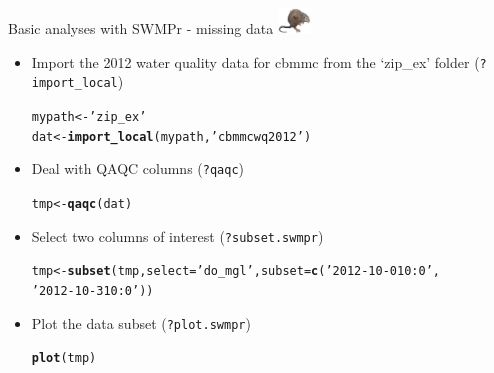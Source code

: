 \documentclass[xcolor=dvipsnames,serif]{beamer}\usepackage[]{graphicx}\usepackage[]{color}
\makeatletter
\newcommand{\hlstr}[1]{\textcolor[rgb]{0.192,0.494,0.8}{#1}}%
\newcommand{\hlstd}[1]{\textcolor[rgb]{0.345,0.345,0.345}{#1}}%
\newcommand{\hlkwb}[1]{\textcolor[rgb]{0.69,0.353,0.396}{#1}}%
\newcommand{\hlkwc}[1]{\textcolor[rgb]{0.333,0.667,0.333}{#1}}%
\newcommand{\hlkwd}[1]{\textcolor[rgb]{0.737,0.353,0.396}{\textbf{#1}}}%
\newenvironment{kframe}{%
 \def\at@end@of@kframe{}%
 \ifinner\ifhmode%
  \def\at@end@of@kframe{\end{minipage}}%
  \begin{minipage}{\columnwidth}%
 \fi\fi%
 \def\FrameCommand##1{\hskip\@totalleftmargin \hskip-\fboxsep
 \colorbox{shadecolor}{##1}\hskip-\fboxsep
     \hskip-\linewidth \hskip-\@totalleftmargin \hskip\columnwidth}%
 \MakeFramed {\advance\hsize-\width
   \@totalleftmargin\z@ \linewidth\hsize
   \@setminipage}}%
 {\par\unskip\endMakeFramed%
 \at@end@of@kframe}
\newenvironment{knitrout}{}{} %
\makeatother
\begin{document}
\begin{frame}[fragile]{Basic analyses with SWMPr - missing data \includegraphics[width = 0.065\textwidth]{imgs/swmprat.png}}
\begin{itemize}
\item {}
Import the 2012 water quality data for cbmmc from the `zip\_ex' folder (\texttt{?import\_local})
\begin{knitrout}\scriptsize
{}\color{fgcolor}\begin{kframe}
\begin{alltt}
\hlstd{mypath} \hlkwb{<-} \hlstr{'zip_ex'}
\hlstd{dat} \hlkwb{<-} \hlkwd{import_local}\hlstd{(mypath,} \hlstr{'cbmmcwq2012'}\hlstd{)}
\end{alltt}
\end{kframe}
\end{knitrout}
\vspace{0.1in}
\item {}
Deal with QAQC columns (\texttt{?qaqc})
\begin{knitrout}\scriptsize
{}\color{fgcolor}\begin{kframe}
\begin{alltt}
\hlstd{tmp} \hlkwb{<-} \hlkwd{qaqc}\hlstd{(dat)}
\end{alltt}
\end{kframe}
\end{knitrout}
\vspace{0.1in}
\item {}
Select two columns of interest (\texttt{?subset.swmpr})
\begin{knitrout}\scriptsize
{}\color{fgcolor}\begin{kframe}
\begin{alltt}
\hlstd{tmp} \hlkwb{<-} \hlkwd{subset}\hlstd{(tmp,} \hlkwc{select} \hlstd{=} \hlstr{'do_mgl'}\hlstd{,} \hlkwc{subset} \hlstd{=} \hlkwd{c}\hlstd{(}\hlstr{'2012-10-01 0:0'}\hlstd{,}
  \hlstr{'2012-10-31 0:0'}\hlstd{))}
\end{alltt}
\end{kframe}
\end{knitrout}
\vspace{0.1in}
\item {}
Plot the data subset (\texttt{?plot.swmpr})
\begin{knitrout}\scriptsize
{}\color{fgcolor}\begin{kframe}
\begin{alltt}
\hlkwd{plot}\hlstd{(tmp)}
\end{alltt}
\end{kframe}
\end{knitrout}
\end{itemize}
\end{frame}
\end{document}
